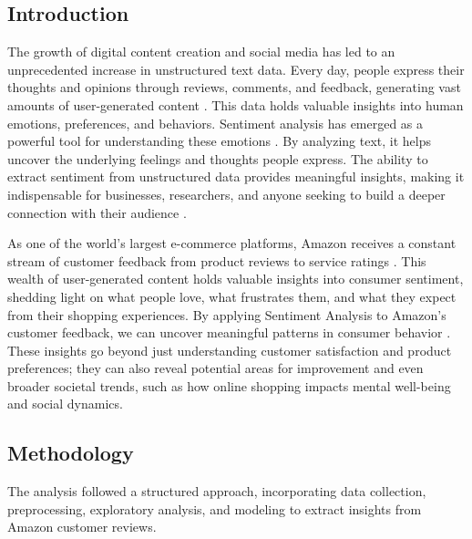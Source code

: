 \documentclass[preprint, 3p,
authoryear]{elsarticle} %
\begin{document}
\subsection{Introduction}\label{introduction}

The growth of digital content creation and social media has led to an
unprecedented increase in unstructured text data. Every day, people
express their thoughts and opinions through reviews, comments, and
feedback, generating vast amounts of user-generated content
\citep{liu2012sentiment}. This data holds valuable insights into human
emotions, preferences, and behaviors. Sentiment analysis has emerged as
a powerful tool for understanding these emotions
\citep{pang2008opinion}. By analyzing text, it helps uncover the
underlying feelings and thoughts people express. The ability to extract
sentiment from unstructured data provides meaningful insights, making it
indispensable for businesses, researchers, and anyone seeking to build a
deeper connection with their audience \citep{cambria2013new}.

As one of the world's largest e-commerce platforms, Amazon receives a
constant stream of customer feedback from product reviews to service
ratings \citep{hu2004mining}. This wealth of user-generated content
holds valuable insights into consumer sentiment, shedding light on what
people love, what frustrates them, and what they expect from their
shopping experiences. By applying Sentiment Analysis to Amazon's
customer feedback, we can uncover meaningful patterns in consumer
behavior \citep{zhang2018deep}. These insights go beyond just
understanding customer satisfaction and product preferences; they can
also reveal potential areas for improvement and even broader societal
trends, such as how online shopping impacts mental well-being and social
dynamics.

\subsection{Methodology}\label{methodology}

The analysis followed a structured approach, incorporating data
collection, preprocessing, exploratory analysis, and modeling to extract
insights from Amazon customer reviews.
\end{document}
